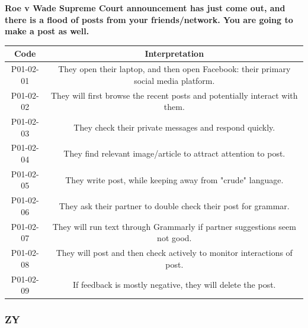 \documentclass[acmsmall,screen,authorversion,nonacm]{acmart}
\begin{document}
\begin{center}
\textbf{Roe v Wade Supreme Court announcement has just come out, and there is a flood of posts from your friends/network. You are going to make a post as well.}
\begin{tabular}{|c|c|}
\hline
\textbf{Code} & \textbf{Interpretation}                                                              \\ \hline
P01-02-01     & They open their laptop, and then open Facebook: their primary social media platform. \\ \hline
P01-02-02     & They will first browse the recent posts and potentially interact with them.          \\ \hline
P01-02-03     & They check their private messages and respond quickly.                               \\ \hline
P01-02-04     & They find relevant image/article to attract attention to post.                       \\ \hline
P01-02-05     & They write post, while keeping away from "crude" language.                           \\ \hline
P01-02-06     & They ask their partner to double check their post for grammar.                       \\ \hline
P01-02-07     & They will run text through Grammarly if partner suggestions seem not good.           \\ \hline
P01-02-08     & They will post and then check actively to monitor interactions of post.              \\ \hline
P01-02-09     & If feedback is mostly negative, they will delete the post.                           \\ \hline
\end{tabular}
\end{center}


\subsubsection{ZY}
\label{C-ZY}
\end{document}
